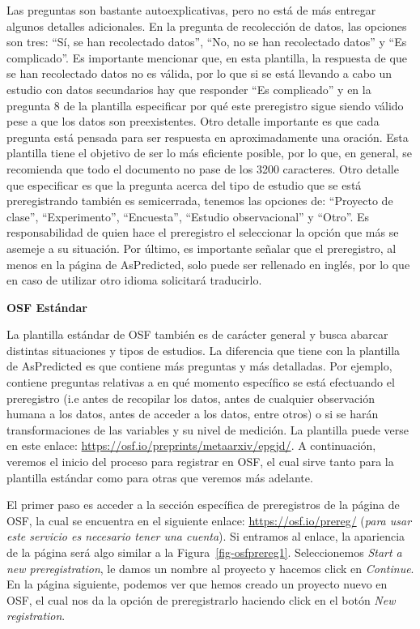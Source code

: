 \documentclass[
  spanish,
  a4paper,
  oneside]{scrbook}
\begin{document}
Las preguntas son bastante autoexplicativas, pero no está de más
entregar algunos detalles adicionales. En la pregunta de recolección de
datos, las opciones son tres: ``Sí, se han recolectado datos'', ``No, no
se han recolectado datos'' y ``Es complicado''. Es importante mencionar
que, en esta plantilla, la respuesta de que se han recolectado datos no
es válida, por lo que si se está llevando a cabo un estudio con datos
secundarios hay que responder ``Es complicado'' y en la pregunta 8 de la
plantilla especificar por qué este preregistro sigue siendo válido pese
a que los datos son preexistentes. Otro detalle importante es que cada
pregunta está pensada para ser respuesta en aproximadamente una oración.
Esta plantilla tiene el objetivo de ser lo más eficiente posible, por lo
que, en general, se recomienda que todo el documento no pase de los 3200
caracteres. Otro detalle que especificar es que la pregunta acerca del
tipo de estudio que se está preregistrando también es semicerrada,
tenemos las opciones de: ``Proyecto de clase'', ``Experimento'',
``Encuesta'', ``Estudio observacional'' y ``Otro''. Es responsabilidad
de quien hace el preregistro el seleccionar la opción que más se asemeje
a su situación. Por último, es importante señalar que el preregistro, al
menos en la página de AsPredicted, solo puede ser rellenado en inglés,
por lo que en caso de utilizar otro idioma solicitará traducirlo.

\textbf{OSF Estándar}

La plantilla estándar de OSF también es de carácter general y busca
abarcar distintas situaciones y tipos de estudios. La diferencia que
tiene con la plantilla de AsPredicted es que contiene más preguntas y
más detalladas. Por ejemplo, contiene preguntas relativas a en qué
momento específico se está efectuando el preregistro (i.e antes de
recopilar los datos, antes de cualquier observación humana a los datos,
antes de acceder a los datos, entre otros) o si se harán
transformaciones de las variables y su nivel de medición. La plantilla
puede verse en este enlace:
\url{https://osf.io/preprints/metaarxiv/epgjd/}. A continuación, veremos
el inicio del proceso para registrar en OSF, el cual sirve tanto para la
plantilla estándar como para otras que veremos más adelante.

El primer paso es acceder a la sección específica de preregistros de la
página de OSF, la cual se encuentra en el siguiente enlace:
\url{https://osf.io/prereg/} (\emph{para usar este servicio es necesario
tener una cuenta}). Si entramos al enlace, la apariencia de la página
será algo similar a la Figura~\ref{fig-osfprereg1}. Seleccionemos
\emph{Start a new preregistration}, le damos un nombre al proyecto y
hacemos click en \emph{Continue}. En la página siguiente, podemos ver
que hemos creado un proyecto nuevo en OSF, el cual nos da la opción de
preregistrarlo haciendo click en el botón \emph{New registration}.
\end{document}
